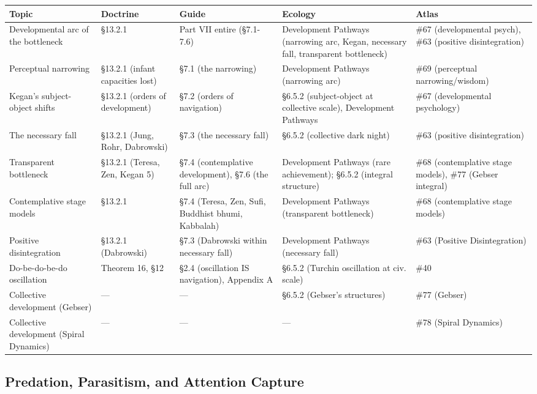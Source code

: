 \begin{longtable}{p{} p{} p{} p{} p{}}
\toprule
\textbf{Topic} & \textbf{Doctrine} & \textbf{Guide} & \textbf{Ecology} & \textbf{Atlas} \\
\midrule
\endhead
Developmental arc of the bottleneck & §13.2.1 & Part VII entire (§7.1-7.6) & Development Pathways (narrowing arc, Kegan, necessary fall, transparent bottleneck) & \#67 (developmental psych), \#63 (positive disintegration) \\
Perceptual narrowing & §13.2.1 (infant capacities lost) & §7.1 (the narrowing) & Development Pathways (narrowing arc) & \#69 (perceptual narrowing/wisdom) \\
Kegan's subject-object shifts & §13.2.1 (orders of development) & §7.2 (orders of navigation) & §6.5.2 (subject-object at collective scale), Development Pathways & \#67 (developmental psychology) \\
The necessary fall & §13.2.1 (Jung, Rohr, Dabrowski) & §7.3 (the necessary fall) & §6.5.2 (collective dark night) & \#63 (positive disintegration) \\
Transparent bottleneck & §13.2.1 (Teresa, Zen, Kegan 5) & §7.4 (contemplative development), §7.6 (the full arc) & Development Pathways (rare achievement); §6.5.2 (integral structure) & \#68 (contemplative stage models), \#77 (Gebser integral) \\
Contemplative stage models & §13.2.1 & §7.4 (Teresa, Zen, Sufi, Buddhist bhumi, Kabbalah) & Development Pathways (transparent bottleneck) & \#68 (contemplative stage models) \\
Positive disintegration & §13.2.1 (Dabrowski) & §7.3 (Dabrowski within necessary fall) & Development Pathways (necessary fall) & \#63 (Positive Disintegration) \\
Do-be-do-be-do oscillation & Theorem 16, §12 & §2.4 (oscillation IS navigation), Appendix A & §6.5.2 (Turchin oscillation at civ. scale) & \#40 \\
Collective development (Gebser) & — & — & §6.5.2 (Gebser's structures) & \#77 (Gebser) \\
Collective development (Spiral Dynamics) & — & — & — & \#78 (Spiral Dynamics) \\
\bottomrule
\end{longtable}



\subsection*{Predation, Parasitism, and Attention Capture}



